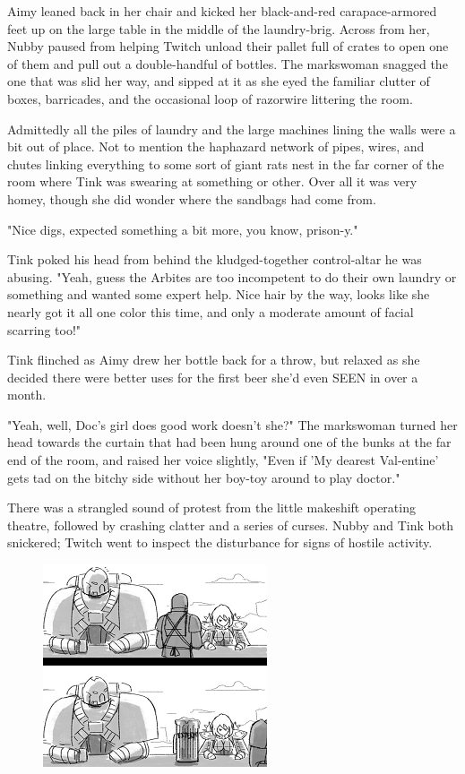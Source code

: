 Aimy leaned back in her chair and kicked her black-and-red carapace-armored feet up on the large table in the middle of the laundry-brig. 
Across from her, Nubby paused from helping Twitch unload their pallet full of crates to open one of them and pull out a double-handful of bottles. 
The markswoman snagged the one that was slid her way, and sipped at it as she eyed the familiar clutter of boxes, barricades, and the occasional loop of razorwire littering the room. 


Admittedly all the piles of laundry and the large machines lining the walls were a bit out of place. 
Not to mention the haphazard network of pipes, wires, and chutes linking everything to some sort of giant rats nest in the far corner of the room where Tink was swearing at something or other. 
Over all it was very homey, though she did wonder where the sandbags had come from.

"Nice digs, expected something a bit more, you know, prison-y."

Tink poked his head from behind the kludged-together control-altar he was abusing. 
"Yeah, guess the Arbites are too incompetent to do their own laundry or something and wanted some expert help. 
Nice hair by the way, looks like she nearly got it all one color this time, and only a moderate amount of facial scarring too!"

Tink flinched as Aimy drew her bottle back for a throw, but relaxed as she decided there were better uses for the first beer she'd even SEEN in over a month.

"Yeah, well, Doc's girl does good work doesn't she?" The markswoman turned her head towards the curtain that had been hung around one of the bunks at the far end of the room, and raised her voice slightly, "Even if 'My dearest Val-entine' gets tad on the bitchy side without her boy-toy around to play doctor."

There was a strangled sound of protest from the little makeshift operating theatre, followed by crashing clatter and a series of curses. 
Nubby and Tink both snickered; 
Twitch went to inspect the disturbance for signs of hostile activity. 



\begin{figure}
	\begin{center}
		\includegraphics[width=\figwidth]{pics/20/13.png}
	\end{center}
\end{figure}


